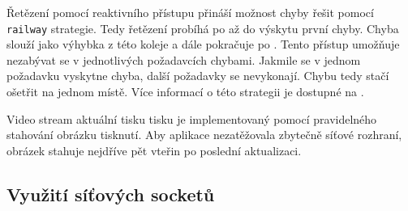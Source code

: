 
Řetězení pomocí reaktivního přístupu přináší možnost chyby řešit pomocí \texttt{railway} strategie.
Tedy řetězení probíhá po  až do výskytu první chyby.
Chyba slouží jako výhybka z této koleje a dále pokračuje po .
Tento přístup umožňuje nezabývat se v jednotlivých požadavcích chybami.
Jakmile se v jednom požadavku vyskytne chyba, další požadavky se nevykonají.
Chybu tedy stačí ošetřit na jednom místě.
Více informací o této strategii je dostupné na \cite{fsharp-railway-strategy}.

Video stream aktuální tisku tisku je implementovaný pomocí pravidelného stahování obrázku tisknutí.
Aby aplikace nezatěžovala zbytečně síťové rozhraní, obrázek stahuje nejdříve pět vteřin po poslední aktualizaci.

\subsection{Využití síťových socketů}

